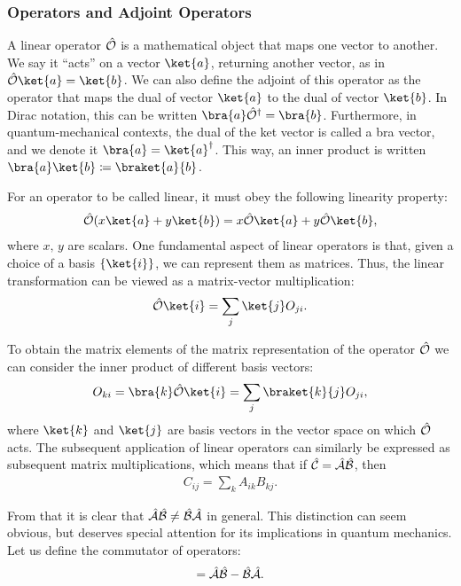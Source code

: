 \subsubsection{Operators and Adjoint Operators}
A linear operator $\hat{\mathcal{O}}$ is a mathematical object that maps one vector to another. We say it ``acts'' on a vector $\ket{a}$, returning another vector, as in $ \op{O}\ket{a}=\ket{b}$. We can also define the adjoint of this operator as the operator that maps the dual \cite{curtis2012linear} of vector $\ket{a}$ to the dual of vector $\ket{b}$. In Dirac notation, this can be written $ \bra{a} \op{O}^\dagger =\bra{b}$. Furthermore, in quantum-mechanical contexts, the dual of the ket vector is called a bra vector, and we denote it $\bra{a} = \ket{a}^\dagger$. This way, an inner product is written $\bra{a}\ket{b} \coloneqq \braket{a}{b}$.

For an operator to be called linear, it must obey the following linearity property:
\begin{align*}
    \op{O}(x\ket{a} + y\ket{b}) = x\op{O}\ket{a} + y\op{O}\ket{b},
\end{align*}
where $x,\,y$ are scalars. One fundamental aspect of linear operators is that, given a choice of a basis $\{\ket{i}\}$, we can represent them as matrices. Thus, the linear transformation can be viewed as a matrix-vector multiplication: 
\begin{align*}
    \op{O}\ket{i} = \sum_{j} \ket{j}O_{ji}.
\end{align*}

To obtain the matrix elements of the matrix representation of the operator $\hat{\mathcal{O}}$ we can consider the inner product of different basis vectors:
\begin{align*}
   O_{ki} = \bra{k}\op{O}\ket{i} = \sum_{j} \braket{k}{j}O_{ji},
\end{align*}
where $\ket{k}$ and $\ket{j}$ are basis vectors in the vector space on which $\hat{\mathcal{O}}$ acts. The subsequent application of linear operators can similarly be expressed as subsequent matrix multiplications, which means that if $\hat{\mathcal{C}} = \hat{\mathcal{A}}\hat{\mathcal{B}}$, then
\begin{align*}
C_{ij} = \sum_k A_{ik}B_{kj}.
\end{align*}

From that it is clear that $\hat{\mathcal{A}}\hat{\mathcal{B}} \neq \hat{\mathcal{B}}\hat{\mathcal{A}}$ in general. This distinction can seem obvious, but deserves special attention for its implications in quantum mechanics. Let us define the commutator of operators:
\begin{align*}
    [\op{A},\, \op{B}] = \op{A} \op{B} - \op{B}\op{A}.
\end{align*}

